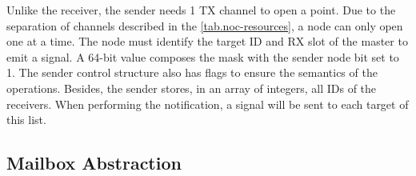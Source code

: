 
				Unlike the receiver, the sender needs 1 \cnoc TX channel to open a \sync point. Due to the separation of channels described in the \autoref{tab.noc-resources}, a node can only open one \sync at a time. The node must identify the target ID and RX slot of the master to emit a signal. A 64-bit value composes the mask with the sender node bit set to 1. The sender control structure also has flags to ensure the semantics of the operations. Besides, the sender stores, in an array of integers, all IDs of the receivers. When performing the notification, a signal will be sent to each target of this list.

		\subsection{Mailbox Abstraction}
		\label{sec.mailbox-abs}



